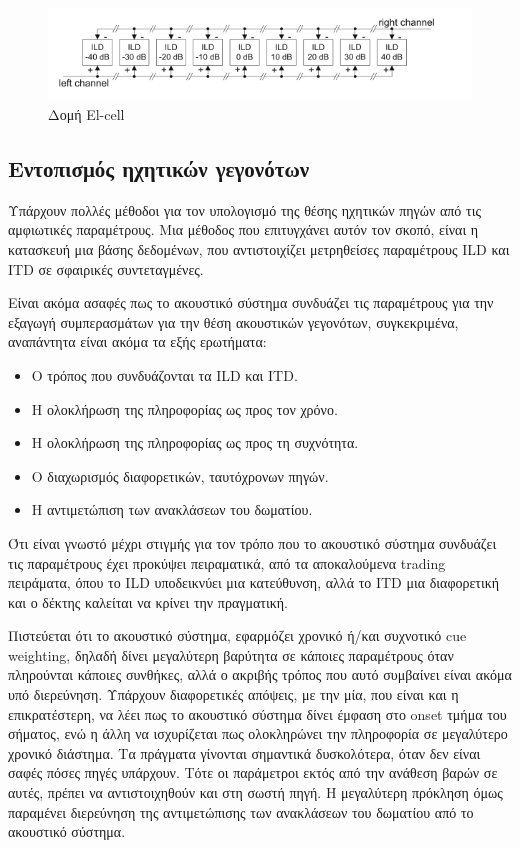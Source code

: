\begin{figure}[h]
  \centering
  \includegraphics[width=\textwidth]{images/el-cell-structure.png}
  \caption{Δομή El-cell}
  \label{fig:el-cell-structure}
\end{figure}

\subsection{Εντοπισμός ηχητικών γεγονότων}

Υπάρχουν πολλές μέθοδοι για τον υπολογισμό της θέσης ηχητικών πηγών από τις αμφιωτικές παραμέτρους. Μια μέθοδος που επιτυγχάνει αυτόν τον σκοπό, είναι η κατασκευή μια βάσης δεδομένων, που αντιστοιχίζει μετρηθείσες παραμέτρους ILD και ITD σε σφαιρικές συντεταγμένες.

Είναι ακόμα ασαφές πως το ακουστικό σύστημα συνδυάζει τις παραμέτρους για την εξαγωγή συμπερασμάτων για την θέση ακουστικών γεγονότων, συγκεκριμένα, αναπάντητα είναι ακόμα τα εξής ερωτήματα:


\begin{itemize}
    \item Ο τρόπος που συνδυάζονται τα ILD και ITD.
    \item Η ολοκλήρωση της πληροφορίας ως προς τον χρόνο.
    \item Η ολοκλήρωση της πληροφορίας ως προς τη συχνότητα.
    \item Ο διαχωρισμός διαφορετικών, ταυτόχρονων πηγών.
    \item Η αντιμετώπιση των ανακλάσεων του δωματίου.
\end{itemize}

Ότι είναι γνωστό μέχρι στιγμής για τον τρόπο που το ακουστικό σύστημα συνδυάζει τις παραμέτρους έχει προκύψει πειραματικά, από τα αποκαλούμενα trading πειράματα, όπου το ILD υποδεικνύει μια κατεύθυνση, αλλά το ITD μια διαφορετική και ο δέκτης καλείται να κρίνει την πραγματική.

Πιστεύεται ότι το ακουστικό σύστημα, εφαρμόζει χρονικό ή/και συχνοτικό cue weighting, δηλαδή δίνει μεγαλύτερη βαρύτητα σε κάποιες παραμέτρους όταν πληρούνται κάποιες συνθήκες, αλλά ο ακριβής τρόπος που αυτό συμβαίνει είναι ακόμα υπό διερεύνηση. Υπάρχουν διαφορετικές απόψεις, με την μία, που είναι και η επικρατέστερη, να λέει πως το ακουστικό σύστημα δίνει έμφαση στο onset τμήμα του σήματος, ενώ η άλλη να ισχυρίζεται πως ολοκληρώνει την πληροφορία σε μεγαλύτερο χρονικό διάστημα. Τα πράγματα γίνονται σημαντικά δυσκολότερα, όταν δεν είναι σαφές πόσες πηγές υπάρχουν. Τότε οι παράμετροι εκτός από την ανάθεση βαρών σε αυτές, πρέπει να αντιστοιχηθούν και στη σωστή πηγή. Η μεγαλύτερη πρόκληση όμως παραμένει διερεύνηση της αντιμετώπισης των ανακλάσεων του δωματίου από το ακουστικό σύστημα.